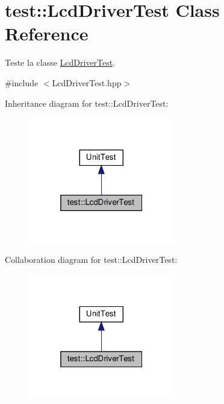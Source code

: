 \hypertarget{classtest_1_1LcdDriverTest}{}\section{test\+:\+:Lcd\+Driver\+Test Class Reference}
\label{classtest_1_1LcdDriverTest}


Teste la classe \hyperlink{classtest_1_1LcdDriverTest}{Lcd\+Driver\+Test}.  




{\ttfamily \#include $<$Lcd\+Driver\+Test.\+hpp$>$}



Inheritance diagram for test\+:\+:Lcd\+Driver\+Test\+:
\nopagebreak
\begin{figure}[H]
\begin{center}
\leavevmode
\includegraphics[width=181pt]{classtest_1_1LcdDriverTest__inherit__graph}
\end{center}
\end{figure}


Collaboration diagram for test\+:\+:Lcd\+Driver\+Test\+:
\nopagebreak
\begin{figure}[H]
\begin{center}
\leavevmode
\includegraphics[width=181pt]{classtest_1_1LcdDriverTest__coll__graph}
\end{center}
\end{figure}
